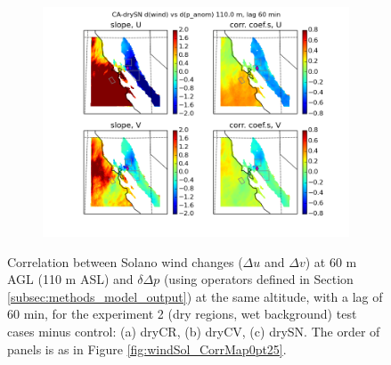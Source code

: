 \begin{figure}[here]
\begin{subfigure}{0.5\textwidth}
\includegraphics[width=\textwidth]{ch3-wind/img/corr_dwind_dpanom_lev110_lag2_drySN.png}
\caption{}
\end{subfigure}
\caption{Correlation between Solano wind changes ($\Delta u$ and $\Delta v$) at 60 m AGL (110 m ASL) and $\delta \Delta p$ (using operators defined in Section \ref{subsec:methods_model_output}) at the same altitude, with a lag of 60 min, for the experiment 2 (dry regions, wet background) test cases minus control: (a) dryCR, (b) dryCV, (c) drySN.  The order of panels is as in Figure \ref{fig:windSol_CorrMap0pt25}.}
\label{fig:windSol_CorrMapDryRg}
\end{figure}

